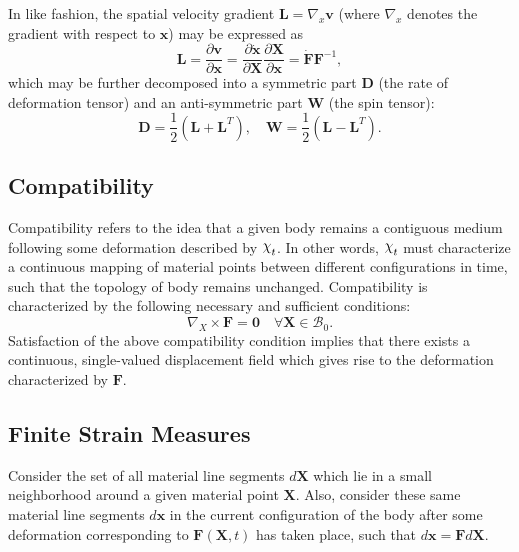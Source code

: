 In like fashion, the spatial velocity gradient $\mathbf{L} = \nabla_x \mathbf{v}$ (where $\nabla_x$ denotes the gradient with respect to $\mathbf{x}$) may be expressed as
\begin{equation}
  \mathbf{L} = \frac{\partial \mathbf{v}}{\partial \mathbf{x}} = \frac{\partial \dot{\mathbf{x}}}{\partial \mathbf{X}} \frac{\partial \mathbf{X}}{\partial \mathbf{x}} = \dot{\mathbf{F}} \mathbf{F}^{-1},
\end{equation}
which may be further decomposed into a symmetric part $\mathbf{D}$ (the rate of deformation tensor) and an anti-symmetric part $\mathbf{W}$ (the spin tensor):
\begin{equation}
  \mathbf{D} = \frac{1}{2} (\mathbf{L} + \mathbf{L}^T), \quad \mathbf{W} = \frac{1}{2} (\mathbf{L} - \mathbf{L}^T).
\end{equation}

\subsection*{Compatibility}

Compatibility refers to the idea that a given body remains a contiguous medium following some deformation described by $\raisebox{\depth}{$\chi$}_t$. In other words, $\raisebox{\depth}{$\chi$}_t$ must characterize a continuous mapping of material points between different configurations in time, such that the topology of body remains unchanged. Compatibility is characterized by the following necessary and sufficient conditions:
\begin{equation}
  \nabla_X \times \mathbf{F} = \mathbf{0} \quad \forall \mathbf{X} \in \mathcal{B}_0.
  \label{eq:compatibility}
\end{equation}
Satisfaction of the above compatibility condition implies that there exists a continuous, single-valued displacement field which gives rise to the deformation characterized by $\mathbf{F}$.

\subsection*{Finite Strain Measures}

Consider the set of all material line segments $d \mathbf{X}$ which lie in a small neighborhood around a given material point $\mathbf{X}$. Also, consider these same material line segments $d \mathbf{x}$ in the current configuration of the body after some deformation corresponding to $\mathbf{F} (\mathbf{X}, t)$ has taken place, such that $d \mathbf{x} = \mathbf{F} d \mathbf{X}$.


